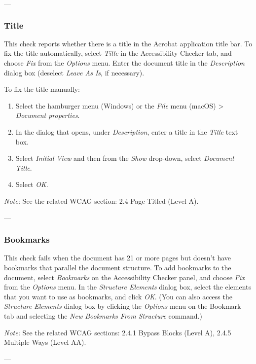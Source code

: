 ---

\subsubsection{Title}
This check reports whether there is a title in the Acrobat application title bar\cite{AdobeHelpX}.
To fix the title automatically, select \emph{Title} in the Accessibility Checker tab, and choose \emph{Fix} from the \emph{Options} menu. Enter the document title in the \emph{Description} dialog box (deselect \emph{Leave As Is}, if necessary).

To fix the title manually:
\begin{enumerate}
    \item Select the hamburger menu (Windows) or the \emph{File} menu (macOS) > \emph{Document properties}.
    \item In the dialog that opens, under \emph{Description}, enter a title in the \emph{Title} text box.
    \item Select \emph{Initial View} and then from the \emph{Show} drop-down, select \emph{Document Title}.
    \item Select \emph{OK}.
\end{enumerate}

\vspace{0.5em}
\noindent\textit{Note:} See the related WCAG section: 2.4 Page Titled (Level A)\cite{WCAG}.

---

\subsubsection{Bookmarks}
This check fails when the document has 21 or more pages but doesn't have bookmarks that parallel the document structure\cite{AdobeHelpX}.
To add bookmarks to the document, select \emph{Bookmarks} on the Accessibility Checker panel, and choose \emph{Fix} from the \emph{Options} menu. In the \emph{Structure Elements} dialog box, select the elements that you want to use as bookmarks, and click \emph{OK}. (You can also access the \emph{Structure Elements} dialog box by clicking the \emph{Options} menu on the Bookmark tab and selecting the \emph{New Bookmarks From Structure} command.)

\vspace{0.5em}
\noindent\textit{Note:} See the related WCAG sections: 2.4.1 Bypass Blocks (Level A), 2.4.5 Multiple Ways (Level AA)\cite{WCAG}.

---

